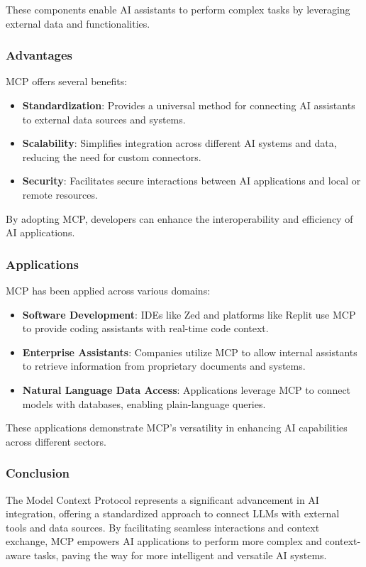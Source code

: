 These components enable AI assistants to perform complex tasks by leveraging external data and functionalities.

\subsubsection{Advantages}
MCP offers several benefits:

\begin{itemize}
    \item \textbf{Standardization}: Provides a universal method for connecting AI assistants to external data sources and systems.
    \item \textbf{Scalability}: Simplifies integration across different AI systems and data, reducing the need for custom connectors.
    \item \textbf{Security}: Facilitates secure interactions between AI applications and local or remote resources.
\end{itemize}

By adopting MCP, developers can enhance the interoperability and efficiency of AI applications.

\subsubsection{Applications}
MCP has been applied across various domains:

\begin{itemize}
    \item \textbf{Software Development}: IDEs like Zed and platforms like Replit use MCP to provide coding assistants with real-time code context.
    \item \textbf{Enterprise Assistants}: Companies utilize MCP to allow internal assistants to retrieve information from proprietary documents and systems.
    \item \textbf{Natural Language Data Access}: Applications leverage MCP to connect models with databases, enabling plain-language queries.
\end{itemize}

These applications demonstrate MCP’s versatility in enhancing AI capabilities across different sectors.

\subsubsection{Conclusion}
The Model Context Protocol represents a significant advancement in AI integration, offering a standardized approach to connect LLMs with external tools and data sources. By facilitating seamless interactions and context exchange, MCP empowers AI applications to perform more complex and context-aware tasks, paving the way for more intelligent and versatile AI systems.

